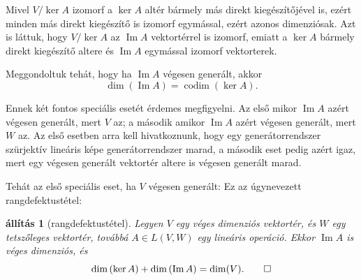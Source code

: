 \documentclass[a4paper, showtrims]{memoir}
\theoremstyle{plain}
\newtheorem{proposition}{állítás}[chapter]
\theoremstyle{remark}
\theoremstyle{definition}
\DeclareMathOperator{\codim}{codim}
\DeclareMathOperator{\im}{Im}
\begin{document}
Mivel $V/\ker{A}$ izomorf a $\ker A$ altér bármely más direkt kiegészítőjével is,
ezért minden más direkt kiegészítő is izomorf egymással, ezért azonos dimenziósak.
Azt is láttuk, hogy $V/\ker{A}$ az $\im A$ vektortérrel is izomorf, 
emiatt a $\ker A$ bármely direkt kiegészítő altere és $\im A$ egymással izomorf vektorterek.

Meggondoltuk tehát, hogy ha $\im A$ végesen generált, akkor
\[
    \dim(\im A)
    =
    \codim(\ker A).
\]

Ennek két fontos speciális esetét érdemes megfigyelni.
Az első mikor $\im A$ azért végesen generált, mert $V$ az;
a második amikor $\im A$ azért végesen generált, mert $W$ az.
Az első esetben arra kell hivatkoznunk, hogy egy generátorrendszer szürjektív lineáris képe generátorrendszer marad, a második eset pedig azért igaz, mert egy végesen generált vektortér altere is végesen 
generált marad.

Tehát az első speciális eset, ha $V$ végesen generált:
Ez az úgynevezett rangdefektustétel:
\begin{proposition}[rangdefektustétel]
	Legyen $V$ egy véges dimenziós vektortér,
	és $W$ egy tetszőleges vektortér,
	továbbá $A\in L\left( V,W \right)$ egy lineáris operáció.
	Ekkor
	$\im A$ is véges dimenziós, és
	\[
		\dim\left( \ker A \right)+\dim\left( \im A \right)=\dim(V).\qedhere
	\]
\end{proposition}
\end{document}
